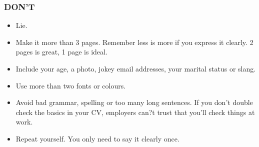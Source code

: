 \begin{frame}
	\frametitle{No Rockstar Profile Pic

\end{frame}

\begin{frame}
	\frametitle{DON'T}

	\begin{itemize}
		\item Lie. 
		\item Make it more than 3 pages. Remember less is more if you express it clearly. 2 pages is great, 1 page is ideal.
 		\item Include your age, a photo, jokey email addresses, your marital status or slang.
		\item Use more than two fonts or colours.
		\item Avoid bad grammar, spelling or too many long sentences. If you don't double check the basics in your CV, employers can?t trust that you'll check things at work.
		\item Repeat yourself. You only need to say it clearly once.
	\end{itemize}
\end{frame}



